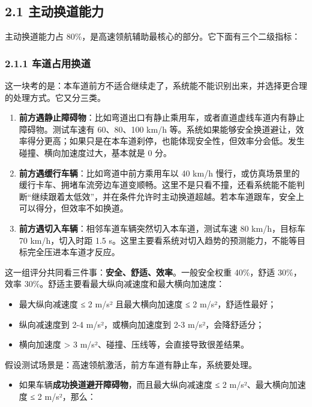 \subsection{2.1 主动换道能力}

主动换道能力占 80\%，是高速领航辅助最核心的部分。它下面有三个二级指标：

\subsubsection{2.1.1 车道占用换道}

这一块考的是：本车道前方不适合继续走了，系统能不能识别出来，并选择更合理的处理方式。它又分三类。

\begin{enumerate}
  \item \textbf{前方遇静止障碍物}：比如弯道出口有静止乘用车，或者直道虚线车道内有静止障碍物。测试车速有 60、80、100 km/h 等。系统如果能够安全换道避让，效率得分更高；如果只是在本车道刹停，也能体现安全性，但效率分会低。发生碰撞、横向加速度过大，基本就是 0 分。
  \item \textbf{前方遇缓行车辆}：比如弯道中前方乘用车以 40 km/h 慢行，或仿真场景里的缓行卡车、拥堵车流旁边车道变顺畅。这里不是只看不撞，还看系统能不能判断“继续跟着太低效”，并在条件允许时主动换道超越。若本车道跟车，安全上可以得分，但效率不如换道。
  \item \textbf{前方遇切入车辆}：相邻车道车辆突然切入本车道，测试车速 80 km/h，目标车 70 km/h，切入时距 1.5 s。这里主要看系统对切入趋势的预测能力，不能等目标完全压进本车道才反应。
\end{enumerate}

这一组评分共同看三件事：\textbf{安全、舒适、效率}。一般安全权重 40\%，舒适 30\%，效率 30\%。舒适主要看最大纵向减速度和最大横向加速度： 

\begin{itemize}
  \item 最大纵向减速度 ≤ 2 m/s² 且最大横向加速度 ≤ 2 m/s²，舒适性最好； 
  \item 纵向减速度到 2-4 m/s²，或横向加速度到 2-3 m/s²，会降舒适分； 
  \item 横向加速度 > 3 m/s²、碰撞、压线等，会直接导致很差结果。
\end{itemize}

假设测试场景是：高速领航激活，前方车道有静止车，系统要处理。

\begin{itemize}
  \item 如果车辆\textbf{成功换道避开障碍物}，而且最大纵向减速度 ≤ 2 m/s²、最大横向加速度 ≤ 2 m/s²，那么：
\end{itemize}

